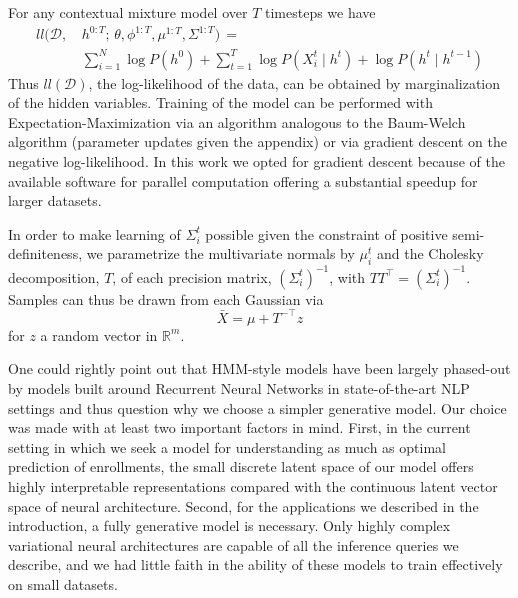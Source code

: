 \documentclass{edm_template}
\begin{document}
For any contextual mixture model over $T$ timesteps we have
\begin{align*}
ll(\mathcal{D}, \, &h^{0:T} ; \, \theta,\phi^{1:T},\mu^{1:T},\Sigma^{1:T}) \, = \\
&\sum_{i=1}^N \log P(h^0) + \sum_{t=1}^T \log P(X^t_i \mid h^t) + \log P(h^t \mid h^{t-1})
\end{align*}
Thus $ll(\mathcal{D})$, the log-likelihood of the data, can be obtained by marginalization of the hidden variables. Training of the model can be performed with Expectation-Maximization via an algorithm analogous to the Baum-Welch algorithm (parameter updates given the appendix) or via gradient descent on the negative log-likelihood. In this work we opted for gradient descent because of the available software for parallel computation offering a substantial speedup for larger datasets. 

In order to make learning of $\Sigma^t_i$ possible given the constraint of positive semi-definiteness, we parametrize the multivariate normals by $\mu_i^t$ and the Cholesky decomposition, $T$, of each precision matrix, $(\Sigma^t_i)^{-1}$, with $TT^\top = (\Sigma^t_i)^{-1}$. Samples can thus be drawn from each Gaussian via 
$$\bar{X} = \mu + T^{-\top} z$$ 
for $z$ a random vector in $\mathbb{R}^m$. 

One could rightly point out that HMM-style models have been largely phased-out by models built around Recurrent Neural Networks in state-of-the-art NLP settings and thus question why we choose a simpler generative model. Our choice was made with at least two important factors in mind. First, in the current setting in which we seek a model for understanding as much as optimal prediction of enrollments, the small discrete latent space of our model offers highly interpretable representations compared with the continuous latent vector space of neural architecture. Second, for the applications we described in the introduction, a fully generative model is necessary. Only highly complex variational neural architectures are capable of all the inference queries we describe, and we had little faith in the ability of these models to train effectively on small datasets. 
\end{document}
